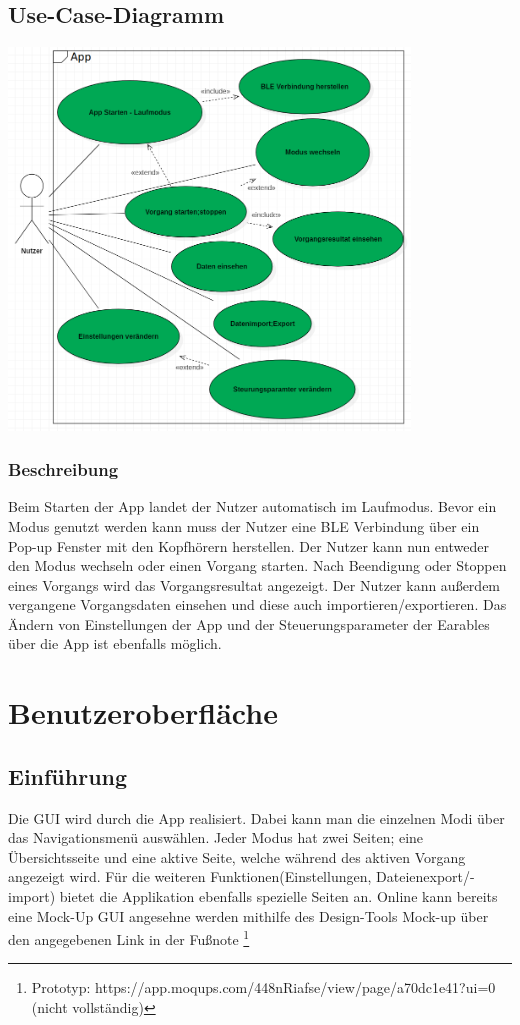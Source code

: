 \documentclass[a4paper,12pt]{article}
\begin{document}
  \subsection{Use-Case-Diagramm}
  \begin{center}
	\includegraphics[width=0.8\textwidth]{./Diagramme/Use-CaseDiagramm.png} 
  \end{center}

\subsubsection{Beschreibung} 
Beim Starten der App landet der Nutzer automatisch im Laufmodus. Bevor ein Modus genutzt werden kann muss der Nutzer eine BLE Verbindung über ein Pop-up Fenster mit den Kopfhörern herstellen. Der Nutzer kann nun entweder den Modus wechseln oder einen \Gls{Vorgang} starten. Nach Beendigung oder Stoppen eines Vorgangs wird das Vorgangsresultat angezeigt. Der Nutzer kann außerdem vergangene Vorgangsdaten einsehen und diese auch importieren/exportieren. Das Ändern von Einstellungen der App und der \Gls{Steuerungsparameter} der \Gls{Earables} über die App ist ebenfalls möglich.
\section{Benutzeroberfläche}
\subsection{Einführung}
Die \Gls{GUI} wird durch die App realisiert. Dabei kann man die einzelnen Modi über das Navigationsmenü auswählen. Jeder Modus hat zwei Seiten; eine Übersichtsseite und eine aktive Seite, welche während des aktiven \Gls{Vorgang} angezeigt wird. Für die weiteren Funktionen(Einstellungen, Dateienexport/-import) bietet die Applikation ebenfalls spezielle Seiten an.
Online kann bereits eine Mock-Up \Gls{GUI} angesehne werden mithilfe des Design-Tools \glqq Mock-up\grqq{} über den angegebenen Link in der Fußnote \footnote[1]{Prototyp: https://app.moqups.com/448nRiafse/view/page/a70dc1e41?ui=0 (nicht vollständig)}
\end{document}
